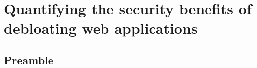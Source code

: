 \chapter{Quantifying the security benefits of debloating web applications}

\section*{Preamble}












